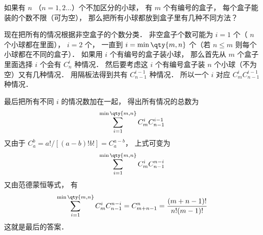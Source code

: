 

如果有 $n$ （$n=1,2\dots$）个不加区分的小球， 有 $m$ 个有编号的盒子， 每个盒子能装的个数不限（可为空）， 那么把所有小球都放到盒子里有几种不同方法？

现在把所有的情况根据非空盒子的个数分类． 非空盒子个数可能为 $i=1$ 个（ $n$ 个小球都在里面）， $i=2$ 个， 一直到 $i=\min\qty{m,n}$ 个（若 $n\leqslant m$ 则每个小球都在不同的盒子）． 如果用 $i$ 个有编号的盒子装小球， 那么首先从 $m$ 个盒子里面选择 $i$ 个会有 $C_n^i$ 种情况． 然后要考虑这 $i$ 个有编号盒子装 $n$ 个小球（不为空）又有几种情况． 用隔板法得到共有 $C_{n-1}^{i-1}$ 种情况． 所以一个 $i$ 对应 $C_m^i C_{n-1}^{i-1}$ 种情况．

最后把所有不同 $i$ 的情况数加在一起， 得出所有情况的总数为
\begin{equation}
\sum_{i = 1}^{\min\qty{m,n}} C_m^i C_{n-1}^{i-1}
\end{equation}
又由于 $C_a^b = a!/[(a-b)!b!] = C_a^{a-b}$， 上式可变为
\begin{equation}
\sum_{i=1}^{\min\qty{m,n}}  C_m^i C_{n-1}^{n-i}
\end{equation}
又由范德蒙恒等式， 有
\begin{equation}
\sum_{i=1}^{\min\qty{m,n}}  C_m^i C_{n-1}^{n-i} = C_{m+n-1}^n = \frac{(m+n-1)!}{n!(m - 1)!}
\end{equation}
这就是最后的答案．
